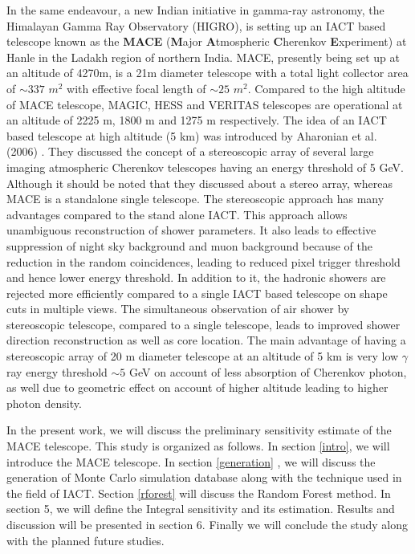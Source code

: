 \documentclass[preprint,12pt]{elsarticle}
\begin{document}
In the same endeavour, a new Indian initiative in gamma-ray astronomy,
the Himalayan Gamma Ray Observatory (HIGRO), is setting up an IACT based telescope known as the {\bf MACE} ({\bf M}ajor 
{\bf A}tmospheric {\bf C}herenkov {\bf E}xperiment) at Hanle in the Ladakh region of northern India. MACE, 
presently being set up at an altitude of 4270m, is a 21m diameter 
telescope with a total light collector area of $\sim 337$ $m^2$ with effective focal length of $\sim 25$ $m^2$. 
Compared to the high altitude of MACE telescope, MAGIC, HESS and VERITAS telescopes 
are operational at an altitude of 2225 m, 1800 m and 1275 m respectively. %
The idea of an IACT based telescope at high altitude (5 km) was introduced by 
Aharonian et al. (2006) \cite{konopelko}. They discussed the 
concept of a stereoscopic array of several large imaging atmospheric Cherenkov telescopes having 
an  energy threshold of 5 GeV. Although it should be noted that they discussed about   
a stereo array, whereas MACE is a standalone single telescope. The stereoscopic approach has many 
advantages compared to the stand alone IACT. This approach allows unambiguous reconstruction of shower 
parameters. It also leads to effective suppression of night sky background and muon background 
because of the reduction in  the random coincidences, leading to reduced pixel trigger threshold 
and hence lower energy threshold. In addition to it, the hadronic showers are rejected more 
efficiently compared to a single IACT based telescope on shape cuts in multiple views. The simultaneous 
observation of air shower by stereoscopic telescope, compared to a single telescope, leads to 
improved shower direction reconstruction as well as core location. The main advantage of 
having a stereoscopic array of 20 m diameter telescope at an altitude of 5 km 
is very low $\gamma$ ray energy threshold $\sim 5$ GeV on account of 
less absorption of Cherenkov photon, as well due to geometric effect on account of higher 
altitude leading to higher photon density. 

In the present work, we will discuss the preliminary sensitivity estimate of the MACE telescope. 
This study is organized as follows. In section \ref{intro}, we will introduce the MACE telescope. In  section \ref{generation} , we will discuss the generation of 
Monte Carlo simulation database along with the technique used in the field of IACT. Section \ref{rforest} will discuss the Random Forest method.
In section 5, we will define the Integral sensitivity and its estimation. Results and discussion will be presented in section 6. 
Finally we will conclude the study along with the planned future studies.%
\end{document}
